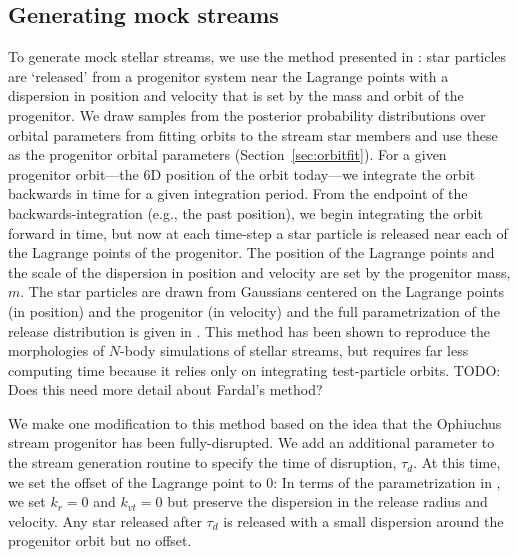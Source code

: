 \documentclass[letterpaper,12pt,preprint]{aastex}
\newcommand{\todo}[1]{{\color{red} TODO: #1}}
\begin{document}

\subsection{Generating mock streams}\label{sec:mocks}

To generate mock stellar streams, we use the method presented in \citep{fardal14}: star particles are `released' from a progenitor system near the Lagrange points with a dispersion in position and velocity that is set by the mass and orbit of the progenitor. We draw samples from the posterior probability distributions over orbital parameters from fitting orbits to the stream star members and use these as the progenitor orbital parameters (Section~\ref{sec:orbitfit}). For a given progenitor orbit---the 6D position of the orbit today---we integrate the orbit backwards in time for a given integration period. From the endpoint of the backwards-integration (e.g., the past position), we begin integrating the orbit forward in time, but now at each time-step a star particle is released near each of the Lagrange points of the progenitor. The position of the Lagrange points and the scale of the dispersion in position and velocity are set by the progenitor mass, $m$. The star particles are drawn from Gaussians centered on the Lagrange points (in position) and the progenitor (in velocity) and the full parametrization of the release distribution is given in \cite{fardal14}. This method has been shown to reproduce the morphologies of $N$-body simulations of stellar streams, but requires far less computing time because it relies only on integrating test-particle orbits. \todo{Does this need more detail  about Fardal's method?}

We make one modification to this method based on the idea that the Ophiuchus stream progenitor has been fully-disrupted. We add an additional parameter to the stream generation routine to specify the time of disruption, $\tau_d$. At this time, we set the offset of the Lagrange point to 0: In terms of the parametrization in \citep{fardal14}, we set $k_r = 0$ and $k_{vt}=0$ but preserve the dispersion in the release radius and velocity. Any star released after $\tau_d$ is released with a small dispersion around the progenitor orbit but no offset.
\end{document}
